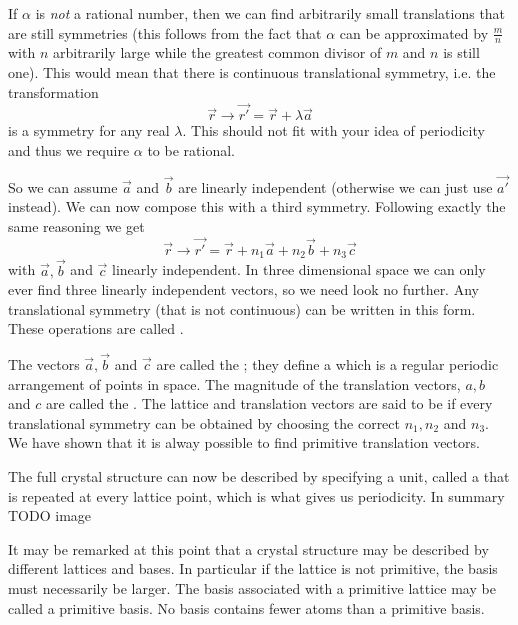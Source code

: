 If $\alpha$ is \textit{not} a rational number, then we can find arbitrarily small translations that are still symmetries (this follows from the fact that $\alpha$ can be approximated by $\frac{m}{n}$ with $n$ arbitrarily large while the greatest common divisor of $m$ and $n$ is still one). This would mean that there is continuous translational symmetry, i.e. the transformation
\[ \vec{r} \to \vec{r'} = \vec{r} +  \lambda\vec{a}\]
is a symmetry for any real $\lambda$. This should not fit with your idea of periodicity and thus we require $\alpha$ to be rational.

So we can assume $\vec{a}$ and $\vec{b}$ are linearly independent (otherwise we can just use $\vec{a'}$ instead). We can now compose this with a third symmetry. Following exactly the same reasoning we get
\[ \vec{r} \to \vec{r'} = \vec{r} + n_1 \vec{a} + n_2 \vec{b} + n_3 \vec{c} \]
with $\vec{a}, \vec{b}$ and $\vec{c}$ linearly independent. In three dimensional space we can only ever find three linearly independent vectors, so we need look no further. Any translational symmetry (that is not continuous) can be written in this form. These operations are called .

The vectors $\vec{a}, \vec{b}$ and $\vec{c}$ are called the ; they define a  which is a regular periodic arrangement of points in space. The magnitude of the translation vectors, $a, b$ and $c$ are called the . The lattice and translation vectors are said to be  if every translational symmetry can be obtained by choosing the correct $n_1, n_2$ and $n_3$. We have shown that it is alway possible to find primitive translation vectors.

The full crystal structure can now be described by specifying a unit, called a  that is repeated at every lattice point, which is what gives us periodicity. In summary
TODO image

It may be remarked at this point that a crystal structure may be described by different lattices and bases. In particular if the lattice is not primitive, the basis must necessarily be larger. The basis associated with a primitive lattice may be called a primitive basis. No basis contains fewer atoms than a primitive basis.


